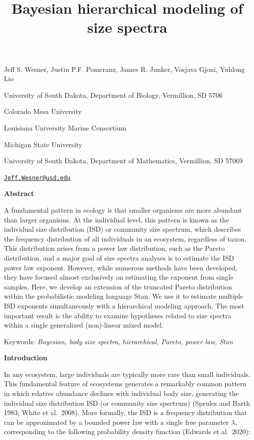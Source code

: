 \documentclass[
  12pt,
]{article}
\title{Bayesian hierarchical modeling of size spectra}
\author{}
\date{\vspace{-2.5em}}
\begin{document}
\maketitle

Jeff S. Wesner, Justin P.F. Pomeranz, James R. Junker, Vosjava Gjoni,
Yuhlong Lio

University of South Dakota, Department of Biology, Vermillion, SD 5706

Colorado Mesa University

Louisiana University Marine Consortium

Michigan State University

University of South Dakota, Department of Mathematics, Vermillion, SD
57069

\href{mailto:Jeff.Wesner@usd.edu}{\nolinkurl{Jeff.Wesner@usd.edu}}

\newpage

\textbf{Abstract}

A fundamental pattern in ecology is that smaller organisms are more
abundant than larger organisms. At the individual level, this pattern is
known as the individual size distribution (ISD) or community size
spectrum, which describes the frequency distribution of all individuals
in an ecosystem, regardless of taxon. This distribution arises from a
power law distribution, such as the Pareto distribution, and a major
goal of size spectra analyses is to estimate the ISD power law exponent.
However, while numerous methods have been developed, they have focused
almost exclusively on estimating the exponent from single samples. Here,
we develop an extension of the truncated Pareto distribution within the
probabilistic modeling language Stan. We use it to estimate multiple ISD
exponents simultaneously with a hierarchical modeling approach. The most
important result is the ability to examine hypotheses related to size
spectra within a single generalized (non)-linear mixed model.

Keywords: \emph{Bayesian, body size spectra, hierarchical, Pareto, power
law, Stan}

\newpage

\textbf{Introduction}

In any ecosystem, large individuals are typically more rare than small
individuals. This fundamental feature of ecosystems generates a
remarkably common pattern in which relative abundance declines with
individual body size, generating the individual size distribution ISD
(or community size spectrum) (Sprules and Barth 1983; White et
al.~2008). More formally, the ISD is a frequency distribution that can
be approximated by a bounded power law with a single free parameter
\(\lambda\), corresponding to the following probability density function
(Edwards et al.~2020):
\end{document}
